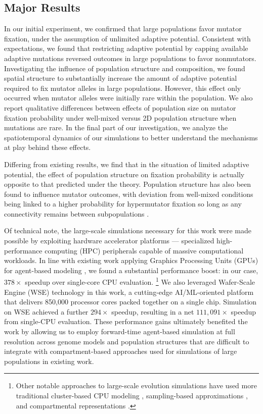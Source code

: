 \subsection{Major Results}

In our initial experiment, we confirmed that large populations favor mutator fixation, under the assumption of unlimited adaptive potential.
Consistent with expectations, we found that restricting adaptive potential by capping available adaptive mutations reversed outcomes in large populations to favor nonmutators.
Investigating the influence of population structure and composition, we found spatial structure to substantially increase the amount of adaptive potential required to fix mutator alleles in large populations.
However, this effect only occurred when mutator alleles were initially rare within the population.
We also report qualitative differences between effects of population size on mutator fixation probability under well-mixed versus 2D population structure when mutations are rare.
In the final part of our investigation, we analyze the spatiotemporal dynamics of our simulations to better understand the mechanisms at play behind these effects.

Differing from existing results, we find that in the situation of limited adaptive potential, the effect of population structure on fixation probability is actually opposite to that predicted under the theory.
Population structure has also been found to influence mutator outcomes, with deviation from well-mixed conditions being linked to a higher probability for hypermutator fixation so long as any connectivity remains between subpopulations \citep{raynes2019migration}.

Of technical note, the large-scale simulations necessary for this work were made possible by exploiting hardware accelerator platforms --- specialized high-performance computing (HPC) peripherals capable of massive computational workloads.
In line with existing work applying Graphics Processing Units (GPUs) for agent-based modeling \citep{turpin2021xaevol,kosiachenko2019mass,perumalla2009switching,heinemann2007artificial,richmond2023flame}, we found a substantial performance boost: in our case, $378\times$ speedup over single-core CPU evaluation.
\footnote{%
Other notable approaches to large-scale evolution simulations have used more traditional cluster-based CPU modeling \citep{moreno2022best,collier2015large,ray1995proposal,turpin2020paevol}, sampling-based approximations \citep{taddei1997role}, and compartmental representations \citep{tenaillon1999mutators}.}
We also leveraged Wafer-Scale Engine (WSE) technology in this work, a cutting-edge AI/ML-oriented platform that delivers 850,000 processor cores packed together on a single chip.
Simulation on WSE achieved a further $294\times$ speedup, resulting in a net $111{,}091\times$ speedup from single-CPU evaluation.
These performance gains ultimately benefited the work by allowing us to employ forward-time agent-based simulation at full resolution across genome models and population structures that are difficult to integrate with compartment-based approaches used for simulations of large populations in existing work.

